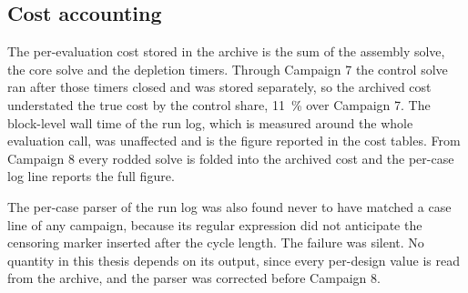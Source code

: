\subsection{Cost accounting}
\label{sec:meth-cost}

The per-evaluation cost stored in the archive is the sum of the
assembly solve, the core solve and the depletion timers. Through
Campaign 7 the control solve ran after those timers closed and was
stored separately, so the archived cost understated the true cost by
the control share, \SI{11}{\%} over Campaign 7. The block-level wall
time of the run log, which is measured around the whole evaluation
call, was unaffected and is the figure reported in the cost tables.
From Campaign 8 every rodded solve is folded into the archived cost
and the per-case log line reports the full figure.

The per-case parser of the run log was also found never to have
matched a case line of any campaign, because its regular expression
did not anticipate the censoring marker inserted after the cycle
length. The failure was silent. No quantity in this thesis depends on
its output, since every per-design value is read from the archive, and
the parser was corrected before Campaign 8.
